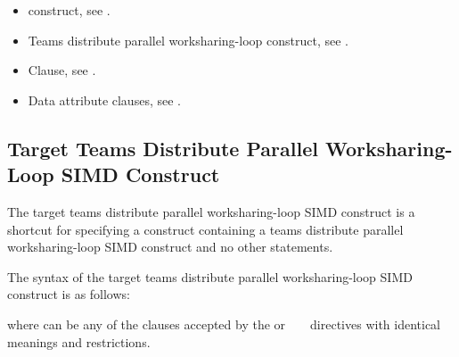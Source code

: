 \crossreferences
\begin{itemize}
\item {} construct, see .

\item Teams distribute parallel worksharing-loop construct, see
      .

\item {} Clause, see .

\item Data attribute clauses, see
      .
\end{itemize}










\subsection{Target Teams Distribute Parallel Worksharing-Loop SIMD Construct}
\label{subsec:Target Teams Distribute Parallel Loop SIMD Construct}
\summary
The target teams distribute parallel worksharing-loop SIMD construct is a shortcut for specifying a 
construct containing a teams distribute parallel worksharing-loop SIMD construct and no other statements.

\syntax
\begin{ccppspecific}
The syntax of the target teams distribute parallel worksharing-loop SIMD construct is as follows:

\begin{ompcPragma}
#pragma omp target teams distribute parallel for simd \plc{\}
            \plc{[clause[ [},\plc{] clause] ... ] new-line}
    \plc{for-loops}
\end{ompcPragma}

where  can be any of the clauses accepted by the  or
~  ~
directives with identical meanings and restrictions.
\end{ccppspecific}

